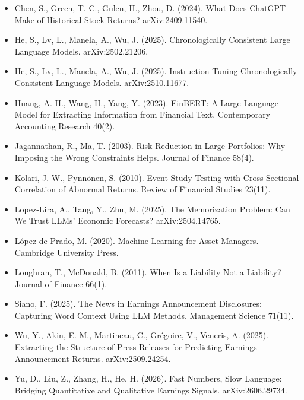 \documentclass[xelatex,ja=standard,jafont=haranoaji,a4paper,10pt,openany]{bxjsreport}
\begin{document}
\begin{itemize}\small
\item Chen, S., Green, T. C., Gulen, H., Zhou, D. (2024). What Does ChatGPT Make of Historical Stock Returns? arXiv:2409.11540.
\item He, S., Lv, L., Manela, A., Wu, J. (2025). Chronologically Consistent Large Language Models. arXiv:2502.21206.
\item He, S., Lv, L., Manela, A., Wu, J. (2025). Instruction Tuning Chronologically Consistent Language Models. arXiv:2510.11677.
\item Huang, A. H., Wang, H., Yang, Y. (2023). FinBERT: A Large Language Model for Extracting Information from Financial Text. Contemporary Accounting Research 40(2).
\item Jagannathan, R., Ma, T. (2003). Risk Reduction in Large Portfolios: Why Imposing the Wrong Constraints Helps. Journal of Finance 58(4).
\item Kolari, J. W., Pynnönen, S. (2010). Event Study Testing with Cross-Sectional Correlation of Abnormal Returns. Review of Financial Studies 23(11).
\item Lopez-Lira, A., Tang, Y., Zhu, M. (2025). The Memorization Problem: Can We Trust LLMs' Economic Forecasts? arXiv:2504.14765.
\item López de Prado, M. (2020). Machine Learning for Asset Managers. Cambridge University Press.
\item Loughran, T., McDonald, B. (2011). When Is a Liability Not a Liability? Journal of Finance 66(1).
\item Siano, F. (2025). The News in Earnings Announcement Disclosures: Capturing Word Context Using LLM Methods. Management Science 71(11).
\item Wu, Y., Akin, E. M., Martineau, C., Grégoire, V., Veneris, A. (2025). Extracting the Structure of Press Releases for Predicting Earnings Announcement Returns. arXiv:2509.24254.
\item Yu, D., Liu, Z., Zhang, H., He, H. (2026). Fast Numbers, Slow Language: Bridging Quantitative and Qualitative Earnings Signals. arXiv:2606.29734.
\end{itemize}
\end{document}
